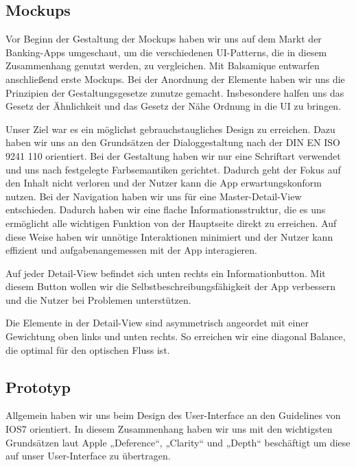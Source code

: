 
\subsection{Mockups}
	Vor Beginn der Gestaltung der Mockups haben wir uns auf dem Markt der Banking-Apps umgeschaut, um die verschiedenen UI-Patterns, die in diesem Zusammenhang genutzt werden, zu vergleichen. Mit Balsamique entwarfen anschließend erste Mockups. Bei der Anordnung der Elemente haben wir uns die Prinzipien der Gestaltungsgesetze zunutze gemacht. Insbesondere halfen uns das Gesetz der Ähnlichkeit und das Gesetz der Nähe Ordnung in die UI zu bringen. 

	Unser Ziel war es ein möglichst gebrauchstaugliches Design zu erreichen. Dazu haben wir uns an den Grundsätzen der Dialoggestaltung nach der DIN EN ISO 9241 110 orientiert. Bei der Gestaltung haben wir nur eine Schriftart verwendet und uns nach festgelegte Farbsemantiken gerichtet. Dadurch geht der Fokus auf den Inhalt nicht verloren und der Nutzer kann die App erwartungskonform nutzen. Bei der Navigation haben wir uns für eine Master-Detail-View entschieden. Dadurch haben wir eine flache Informationsstruktur, die es uns ermöglicht alle wichtigen Funktion von der Hauptseite direkt zu erreichen. Auf diese Weise haben wir unnötige Interaktionen minimiert und der Nutzer kann effizient und aufgabenangemessen mit der App interagieren.  

	Auf jeder Detail-View befindet sich unten rechts ein Informationbutton. Mit diesem Button wollen wir die Selbstbeschreibungsfähigkeit der App verbessern und die Nutzer bei Problemen unterstützen. 

	Die Elemente in der Detail-View sind asymmetrisch angeordet mit einer Gewichtung oben links und unten rechts. So erreichen wir eine diagonal Balance, die optimal für den optischen Fluss ist.

\subsection{Prototyp}
	Allgemein haben wir uns beim Design des User-Interface an den Guidelines von IOS7 orientiert. In diesem Zusammenhang haben wir uns mit den wichtigsten Grundsätzen laut Apple „Deference“, „Clarity“ und „Depth“ beschäftigt um diese auf unser User-Interface zu übertragen. 
	
